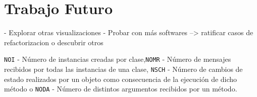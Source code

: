\par 

\section{Trabajo Futuro}

\par 
- Explorar otras visualizaciones
- Probar con más softwares --> ratificar casos de refactorizacion o descubrir otros

{\tt NOI} - Número de instancias creadas por clase,{\tt NOMR} - Número de mensajes recibidos por todas las instancias de una clase, {\tt NSCH} - Número de cambios de estado realizados por un objeto como consecuencia de la ejecución de dicho método o {\tt NODA} - Número de distintos argumentos recibidos por un método. 



